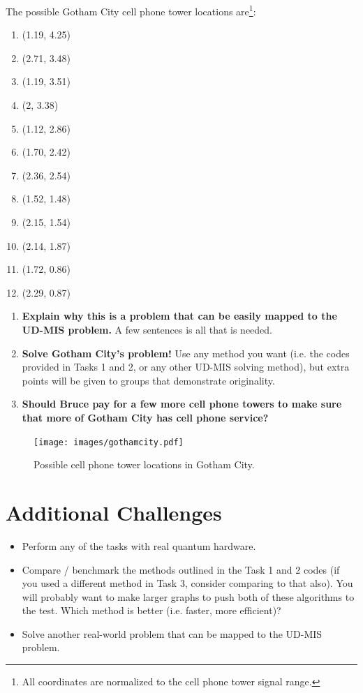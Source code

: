 \documentclass[12pt]{article}
\begin{document}
The possible Gotham City cell phone tower locations are\footnote{All coordinates are normalized to the cell phone tower signal range.}:
\begin{enumerate}
	\item (1.19, 4.25)
	\item (2.71, 3.48)
	\item (1.19, 3.51)
	\item (2, 3.38)
	\item (1.12, 2.86)
	\item (1.70, 2.42)
	\item (2.36, 2.54)
	\item (1.52, 1.48)
	\item (2.15, 1.54)
	\item (2.14, 1.87)
	\item (1.72, 0.86)
	\item (2.29, 0.87)
\end{enumerate}

\begin{enumerate}
	\item {\bf Explain why this is a problem that can be easily mapped to the UD-MIS problem.} A few sentences is all that is needed.
	\item {\bf Solve Gotham City's problem!} Use any method you want (i.e. the codes provided in Tasks 1 and 2, or any other UD-MIS solving method), but extra points will be given to groups that demonstrate originality.
	\item {\bf Should Bruce pay for a few more cell phone towers to make sure that more of Gotham City has cell phone service?}
\end{enumerate}

\begin{figure}
    \begin{center}
        \texttt{[image: images/gothamcity.pdf]}
    \end{center}
    \caption{Possible cell phone tower locations in Gotham City.} \label{fig:gotham}
\end{figure}

\section*{Additional Challenges}

\begin{itemize}
	\item Perform any of the tasks with real quantum hardware.
	\item Compare / benchmark the methods outlined in the Task 1 and 2 codes (if you used a different method in Task 3, consider comparing to that also). You will probably want to make larger graphs to push both of these algorithms to the test. Which method is better (i.e. faster, more efficient)?
	\item Solve another real-world problem that can be mapped to the UD-MIS problem.
\end{itemize}



\end{document}
